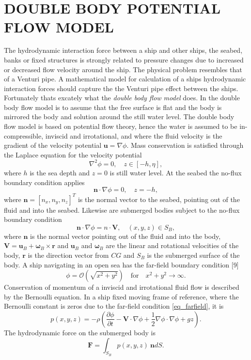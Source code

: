 \documentclass[A4paper,11pt]{marine_2023_Paper}
\newcommand{\V}[1]{\boldsymbol{#1}}
\newcommand{\D}[2]{\frac{\partial #1}{\partial #2}}
\begin{document}
\section{DOUBLE BODY POTENTIAL FLOW MODEL}
The hydrodynamic interaction force between a ship and other ships, the seabed, banks or fixed structures is strongly related to pressure changes due to increased or decreased flow velocity around the ship. The physical problem resembles that of a Venturi pipe. A mathematical model for calculation of a ships hydrodynamic interaction forces should capture the the Venturi pipe effect between the ships. Fortunately thats excately what the \emph{double body flow model} does. In the double body flow model is to assume that the free surface is flat and the body is mirrored the body and solution around
the still water level.
The double body flow model is based on potential flow theory, hence the water is assumed to be in-
compressible, inviscid and irrotational, and where the fluid velocity is the gradient of the velocity potential $\V{u} = \nabla \phi$. 
Mass conservation is satisfied through the Laplace equation for the velocity potential
\begin{equation}
	\nabla^2 \phi = 0, \quad z \in [-h,\eta],
\end{equation}
where $h$ is the sea depth and $z = 0$ is still water level. At the seabed the no-flux boundary condition applies
\begin{equation}
	\V{n} \cdot \nabla \phi = 0, \quad z = -h, 
\end{equation}
where $\V{n} = [n_x, n_y, n_z]^T$ is the normal vector to the seabed, pointing out of the fluid and into the seabed. Likewise are submerged bodies subject to the no-flux boundary condition
\begin{equation}
	\V{n} \cdot \nabla \phi = n \cdot \V{V} , \quad (x, y, z) \in S_B, 
\end{equation}
where $\V{n}$ is the normal vector pointing out of the fluid and into the body, $\V{V} =\V{u}_B + \V{\omega}_B \times \V{r}$ and $\V{u}_B$ and $\V{\omega}_B$ are the linear and rotational velocities of the body, $\V{r}$ is the direction vector from $CG$ and $S_B$ is the submerged surface of the body. A ship navigating in an open sea has the far-field boundary condition [9]
\begin{equation}
	\phi = \mathcal{O} (\sqrt{x^2 + y^2}) \quad \mathrm{for} \quad x^2 + y^2 \rightarrow \infty. 
	\label{eq_farfield}
\end{equation}
Conservation of momentum of a inviscid and irrotational fluid flow is described by the Bernoulli equation. In a ship fixed moving frame of reference, where the Bernoulli constant is zeros due to the far-field condition \eqref{eq_farfield}, it is
\begin{equation}
	p(x, y, z) = -\rho \left(\D{\phi}{t} -\V{V} \cdot \nabla \phi + \frac{1}{2} \nabla \phi \cdot \nabla \phi + gz \right).
	\label{eq_bernoulli}
\end{equation}
The hydrodynamic force on the submerged body is
\begin{equation}
	\V{F} = \int_{S_B} p(x, y, z) ~\V{n} dS.
	\label{eq_hydrodynamic_pressure_force} 
\end{equation}
\end{document}
